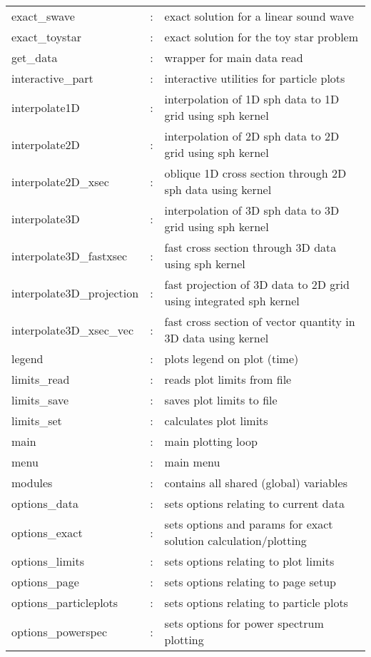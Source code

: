\documentclass[a4paper,12pt]{article}
\begin{document}
\begin{longtable}{|lcp{}|}
exact\_swave        & : & exact solution for a linear sound wave\\
exact\_toystar      & : & exact solution for the toy star problem\\
get\_data           & : & wrapper for main data read\\
interactive\_part   & : & interactive utilities for particle plots\\
interpolate1D	 & : & interpolation of 1D sph data to 1D grid using sph kernel\\
interpolate2D	 & : & interpolation of 2D sph data to 2D grid using sph kernel  \\   
interpolate2D\_xsec & : & oblique 1D cross section through 2D sph data using kernel\\
interpolate3D	 & : & interpolation of 3D sph data to 3D grid using sph kernel\\
interpolate3D\_fastxsec   & : & fast cross section through 3D data using sph kernel\\
interpolate3D\_projection & : & fast projection of 3D data to 2D grid using integrated sph kernel\\
interpolate3D\_xsec\_vec   & : & fast cross section of vector quantity in 3D data using kernel\\
legend		       & : & plots legend on plot (time)\\
limits\_read              & : & reads plot limits from file\\
limits\_save              & : & saves plot limits to file\\
limits\_set               & : & calculates plot limits\\
main               & : & main plotting loop\\
menu               & : & main menu\\
modules		 & : & contains all shared (global) variables\\
options\_data       & : & sets options relating to current data\\
options\_exact	 & : & sets options and params for exact solution calculation/plotting\\
options\_limits     & : & sets options relating to plot limits\\
options\_page       & : & sets options relating to page setup\\
options\_particleplots & : & sets options relating to particle plots\\
options\_powerspec  & : & sets options for power spectrum plotting\\

\end{longtable}
\end{document}
